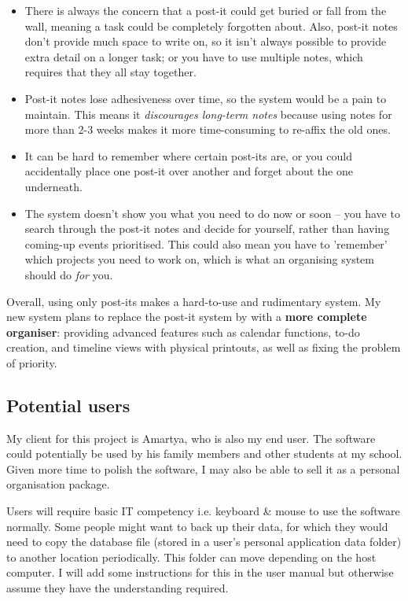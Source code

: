 \begin{itemize}
  \item There is always the concern that a post-it could get buried or fall
        from the wall, meaning a task could be completely forgotten about.
        Also, post-it notes don't provide much space to write on, so it isn't
        always possible to provide extra detail on a longer task; or you have to
        use multiple notes, which requires that they all stay together.
  \item Post-it notes lose adhesiveness over time, so the system would be a pain
        to maintain. This means it \textit{discourages long-term notes} because
        using notes for more than 2-3 weeks makes it more time-consuming to
        re-affix the old ones.
  \item It can be hard to remember where certain post-its are, or you could
        accidentally place one post-it over another and forget about the one
        underneath.
  \item The system doesn't show you what you need to do now or soon -- you have
        to search through the post-it notes and decide for yourself, rather
        than having coming-up events prioritised. This could also mean you have
        to 'remember' which projects you need to work on, which is what an
        organising system should do \textit{for} you.
\end{itemize}

Overall, using only post-its makes a hard-to-use and rudimentary system. My new
system plans to replace the post-it system by with a \textbf{more complete
organiser}: providing advanced features such as calendar functions, to-do
creation, and timeline views with physical printouts, as well as fixing the
problem of priority.


\subsection{Potential users}

My client for this project is Amartya, who is also my end user. The software
could potentially be used by his family members and other students at my school.
Given more time to polish the software, I may also be able to sell it as a
personal organisation package.

Users will require basic IT competency i.e. keyboard \& mouse to use the
software normally. Some people might want to back up their data, for which they
would need to copy the database file (stored in a user's personal application
data folder) to another location periodically. This folder can move depending
on the host computer. I will add some instructions for this in the user manual
but otherwise assume they have the understanding required.


